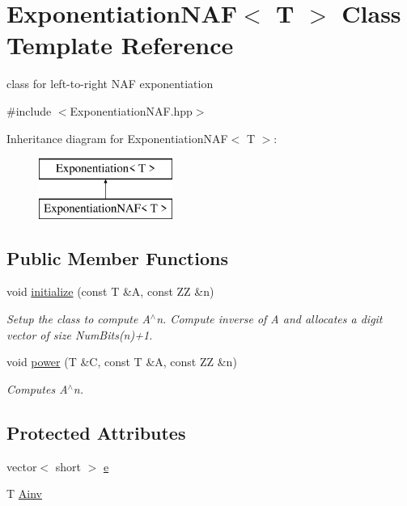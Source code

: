 \hypertarget{classExponentiationNAF}{\section{Exponentiation\-N\-A\-F$<$ T $>$ Class Template Reference}
\label{classExponentiationNAF}
}


class for left-\/to-\/right N\-A\-F exponentiation  




{\ttfamily \#include $<$Exponentiation\-N\-A\-F.\-hpp$>$}

Inheritance diagram for Exponentiation\-N\-A\-F$<$ T $>$\-:\begin{figure}[H]
\begin{center}
\leavevmode
\includegraphics[height=2.000000cm]{da/d14/classExponentiationNAF}
\end{center}
\end{figure}
\subsection*{Public Member Functions}
\begin{DoxyCompactItemize}
\item 
void \hyperlink{classExponentiationNAF_a1e9b79ec2538f12535cc54b6dde9b68c}{initialize} (const T \&A, const Z\-Z \&n)
\begin{DoxyCompactList}\small\item\em Setup the class to compute A$^\wedge$n. Compute inverse of A and allocates a digit vector of size Num\-Bits(n)+1. \end{DoxyCompactList}\item 
void \hyperlink{classExponentiationNAF_a1d880c4c55d754fcf5e225c36e980c03}{power} (T \&C, const T \&A, const Z\-Z \&n)
\begin{DoxyCompactList}\small\item\em Computes A$^\wedge$n. \end{DoxyCompactList}\end{DoxyCompactItemize}
\subsection*{Protected Attributes}
\begin{DoxyCompactItemize}
\item 
vector$<$ short $>$ \hyperlink{classExponentiationNAF_a466325261b0b566860678ca2e0622ba4}{e}
\item 
T \hyperlink{classExponentiationNAF_ae74221c4e5a501c9919d229c92fd87a0}{Ainv}
\end{DoxyCompactItemize}



